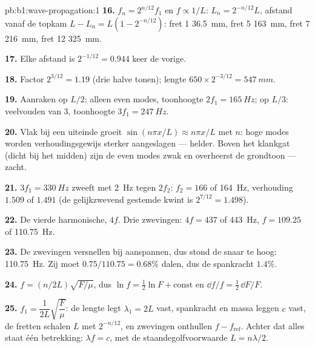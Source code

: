 \begin{solution}{pb:b1:wave-propagation:1}
\textbf{16.} $f_n = 2^{n/12}f_1$ en $f \propto 1/L$: $L_n = 2^{-n/12}L$,
afstand vanaf de topkam $L - L_n = L(1 - 2^{-n/12})$: fret 1 \qty{36.5}{mm},
fret 5 \qty{163}{mm}, fret 7 \qty{216}{mm}, fret 12 \qty{325}{mm}.

\textbf{17.} Elke afstand is $2^{-1/12} = 0.944$ keer de vorige.

\textbf{18.} Factor $2^{3/12} = 1.19$ (drie halve tonen); lengte
$650 \times 2^{-3/12} = \qty{547}{mm}$.

\textbf{19.} Aanraken op $L/2$: alleen even modes, toonhoogte $2f_1 =
\qty{165}{Hz}$; op $L/3$: veelvouden van $3$, toonhoogte $3f_1 = \qty{247}{Hz}$.

\textbf{20.} Vlak bij een uiteinde groeit $\sin(n\pi x/L) \approx n\pi x/L$ met
$n$: hoge modes worden verhoudingsgewijs sterker aangeslagen --- helder. Boven het
klankgat (dicht bij het midden) zijn de even modes zwak en overheerst de grondtoon
--- zacht.

\textbf{21.} $3f_1 = \qty{330}{Hz}$ zweeft met \qty{2}{Hz} tegen $2f_2$:
$f_2 = 166$ of \qty{164}{Hz}, verhouding $1.509$ of $1.491$ (de gelijkzwevend
gestemde kwint is $2^{7/12} = 1.498$).

\textbf{22.} De vierde harmonische, $4f$. Drie zwevingen: $4f = 437$ of
\qty{443}{Hz}, $f = 109.25$ of \qty{110.75}{Hz}.

\textbf{23.} De zwevingen versnellen bij aanspannen, dus stond de snaar te hoog:
\qty{110.75}{Hz}. Zij moet $0.75/110.75 = 0.68\%$ dalen, dus de
spankracht $1.4\%$.

\textbf{24.} $f = (n/2L)\sqrt{F/\mu}$, dus $\ln f = \tfrac12\ln F + \text{const}$
en $\dd f/f = \tfrac12\,\dd F/F$.

\textbf{25.} $f_1 = \dfrac{1}{2L}\sqrt{\dfrac{F}{\mu}}$: de lengte legt
$\lambda_1 = 2L$ vast, spankracht en massa leggen $c$ vast, de fretten schalen $L$ met
$2^{-n/12}$, en zwevingen onthullen $f - f_{\text{ref}}$. Achter dat alles staat één
betrekking: $\lambda f = c$, met de staandegolfvoorwaarde $L = n\lambda/2$.
\end{solution}
